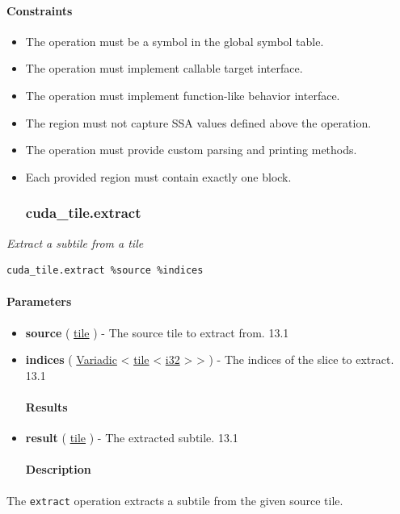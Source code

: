 \documentclass{article}
\begin{document}
\paragraph{Constraints}

\begin{itemize}
\item The operation must be a symbol in the global symbol table.
\item The operation must implement callable target interface.
\item The operation must implement function-like behavior interface.
\item The region must not capture SSA values defined above the operation.
\item The operation must provide custom parsing and printing methods.
\item Each provided region must contain exactly one block.


\subsubsection{cuda\_tile.extract}

\end{itemize}
\textit{Extract a subtile from a tile}


\begin{lstlisting}
cuda_tile.extract %source %indices
\end{lstlisting}

\paragraph{Parameters}

\begin{itemize}
\item \textbf{source} ( \href{https://docs.nvidia.com/cuda/tile-ir/latest/sections/types.html#type-tile}{tile} ) - The source tile to extract from. 13.1
\item \textbf{indices} ( \href{https://docs.nvidia.com/cuda/tile-ir/latest/sections/operations.html#type-variadic}{Variadic} < \href{https://docs.nvidia.com/cuda/tile-ir/latest/sections/types.html#type-tile}{tile} < \href{https://docs.nvidia.com/cuda/tile-ir/latest/sections/types.html#subsection-element-types}{i32} > > ) - The indices of the slice to extract. 13.1


\paragraph{Results}

\item \textbf{result} ( \href{https://docs.nvidia.com/cuda/tile-ir/latest/sections/types.html#type-tile}{tile} ) - The extracted subtile. 13.1


\paragraph{Description}

\end{itemize}
The \texttt{extract} operation extracts a subtile from the given source tile.
\end{document}
